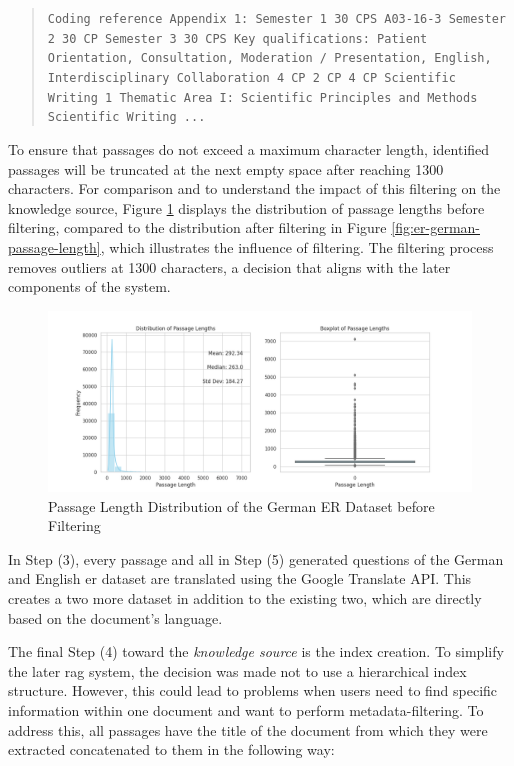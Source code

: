\begin{quote}
    \texttt{Coding reference Appendix 1: Semester 1 30 CPS A03-16-3 Semester 2 30 CP Semester 3 30 CPS Key qualifications: Patient Orientation, Consultation, Moderation / Presentation, English, Interdisciplinary Collaboration 4 CP 2 CP 4 CP Scientific Writing 1 Thematic Area I: Scientific Principles and Methods Scientific Writing ...}
\end{quote}

To ensure that passages do not exceed a maximum character length, identified passages will be truncated at the next empty space after reaching 1300 characters. For comparison and to understand the impact of this filtering on the knowledge source, Figure \ref{fig:er-german-passage-length-old} displays the distribution of passage lengths before filtering, compared to the distribution after filtering in Figure \ref{fig:er-german-passage-length}, which illustrates the influence of filtering. The filtering process removes outliers at 1300 characters, a decision that aligns with the later components of the system.

\begin{figure}
    \centering
    \includegraphics[width=\textwidth]{Grafiken/Statistiken/IndexGerman_Passage_Length_Statistics_old.png}
    \caption{Passage Length Distribution of the German ER Dataset before Filtering}
    \label{fig:er-german-passage-length-old}
\end{figure}

In Step (3), every passage and all in Step (5) generated questions of the German and English \gls{er} dataset are translated using the Google Translate API. This creates a two more dataset in addition to the existing two, which are directly based on the document's language.

The final Step (4) toward the \textit{knowledge source} is the index creation. To simplify the later \gls{rag} system, the decision was made not to use a hierarchical index structure. However, this could lead to problems when users need to find specific information within one document and want to perform metadata-filtering. To address this, all passages have the title of the document from which they were extracted concatenated to them in the following way:

